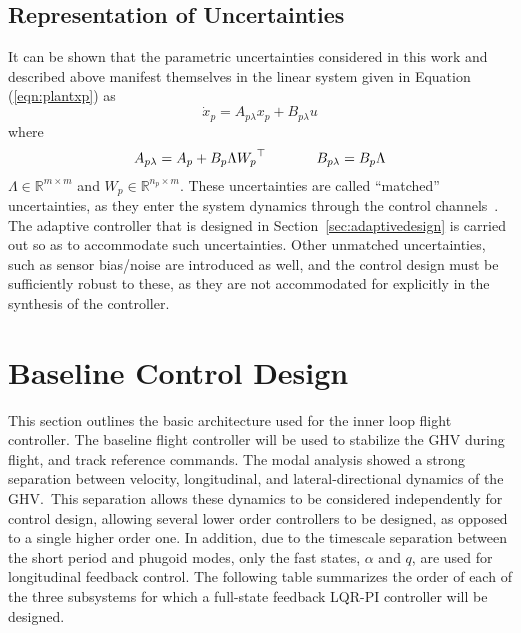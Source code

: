 \documentclass[]{../sty/aiaa-tc}
\begin{document}
  \subsection{Representation of Uncertainties}\label{sec:repofuncertainties}

  It can be shown that the parametric uncertainties considered in this work and described above manifest themselves in the linear system given in Equation (\ref{eqn:plantxp}) as
  \begin{equation}
    \label{eqn:xdotpunc}
    \dot{x}_{p}=A_{p\lambda}x_{p}+B_{p\lambda}u
  \end{equation}
  where
  \begin{equation}
    \label{eqn:linearuncertainties}
    A_{p\lambda}=A_{p}+B_{p}\Lambda{W_{p}}^{\top}
    \hspace{0.5in}
    B_{p\lambda}=B_{p}\Lambda
  \end{equation}
  $\Lambda\in\mathbb{R}^{m\times m}$ and $W_{p}\in\mathbb{R}^{n_{p}\times m}$.
  These uncertainties are called ``matched'' uncertainties, as they enter the system dynamics through the control channels\ \cite{book.lavretskywise.2013}.
  The adaptive controller that is designed in Section~\ref{sec:adaptivedesign} is carried out so as to accommodate such uncertainties.
  Other unmatched uncertainties, such as sensor bias/noise are introduced as well, and the control design must be sufficiently robust to these, as they are not accommodated for explicitly in the synthesis of the controller.

  \section{Baseline Control Design}\label{sec:baselinedesign}

  This section outlines the basic architecture used for the inner loop flight controller.
  The baseline flight controller will be used to stabilize the GHV during flight, and track reference commands.
  The modal analysis showed a strong separation between velocity, longitudinal, and lateral-directional dynamics of the GHV.\
  This separation allows these dynamics to be considered independently for control design, allowing several lower order controllers to be designed, as opposed to a single higher order one.
  In addition, due to the timescale separation between the short period and phugoid modes, only the fast states, $\alpha$ and $q$, are used for longitudinal feedback control.
  The following table summarizes the order of each of the three subsystems for which a full-state feedback LQR-PI controller will be designed.
\end{document}
